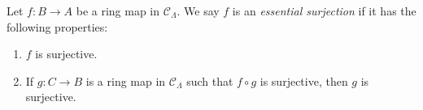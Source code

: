 \begin{definition}
\label{definition-essential-surjection}
Let $f: B \to A$ be a ring map in $\mathcal{C}_\Lambda$.  We say $f$
is an {\it essential surjection} if it has the following properties:
\begin{enumerate}
\item $f$ is surjective.
\item If $g: C \to B$ is a ring map in $\mathcal{C}_\Lambda$ such that
$f \circ g$ is surjective, then $g$ is surjective.
\end{enumerate}
\end{definition}
